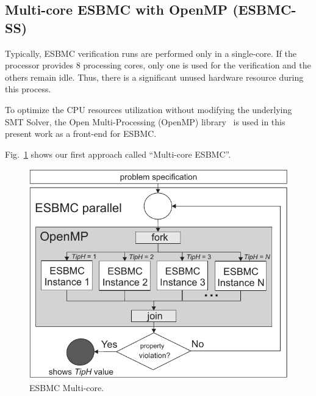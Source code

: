 

\subsection{Multi-core ESBMC with OpenMP (ESBMC-SS)}
\label{Multi-core-ESBMC-with-OpenMP}

Typically, ESBMC verification runs are performed only in a single-core. If the processor provides $8$ processing cores, only one is used for the verification and the others remain idle. Thus, there is a significant unused hardware resource during this process. 


To optimize the CPU resources utilization without modifying the underlying SMT Solver, the Open Multi-Processing (OpenMP) library~\cite{Dagum1998} is used in this present work as a front-end for ESBMC.

Fig.~\ref{ESBMC-Multi-core} shows our first approach called ``Multi-core ESBMC''.
%
\begin{figure}[ht]
	\centering
  \includegraphics[scale=0.75]{Image/esbmc-parallel.pdf} 
	\caption{ESBMC Multi-core.}
	\label{ESBMC-Multi-core}
\end{figure}


